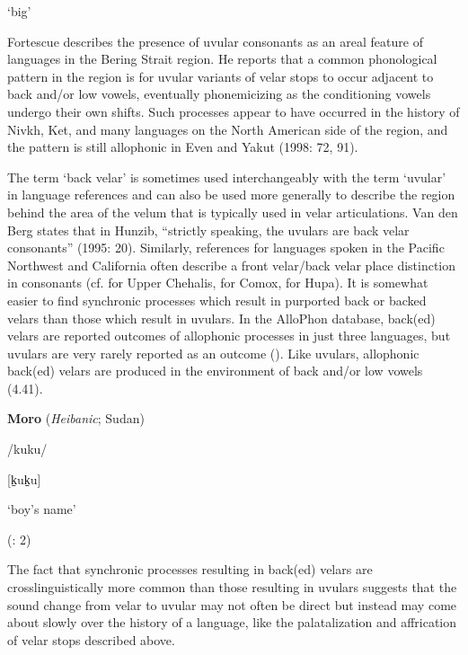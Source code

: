 ‘big’



\citep[76]{Hahn1991}

\z


  Fortescue describes the presence of uvular consonants as an areal feature of languages in the Bering Strait region. He reports that a common phonological pattern in the region is for uvular variants of velar stops to occur adjacent to back and/or low vowels, eventually phonemicizing as the conditioning vowels undergo their own shifts. Such processes appear to have occurred in the history of Nivkh, Ket, and many languages on the North American side of the region, and the pattern is still allophonic in Even and Yakut (1998: 72, 91).



  The term ‘back velar’ is sometimes used interchangeably with the term ‘uvular’ in language references and can also be used more generally to describe the region behind the area of the velum that is typically used in velar articulations. Van den Berg states that in Hunzib, “strictly speaking, the uvulars are back velar consonants” (1995: 20). Similarly, references for languages spoken in the Pacific Northwest and California often describe a front velar/back velar place distinction in consonants (cf. \citealt{Kinkade1963} for Upper Chehalis, \citealt{Harris1981} for Comox, \citealt{Golla1970} for Hupa). It is somewhat easier to find synchronic processes which result in purported back or backed velars than those which result in uvulars. In the AlloPhon database, back(ed) velars are reported outcomes of allophonic processes in just three languages, but uvulars are very rarely reported as an outcome (\citealt{BybeeEasterday2019}). Like uvulars, allophonic back(ed) velars are produced in the environment of back and/or low vowels (4.41).



\ea\label{ex:(4.41)}
  \textbf{Moro} (\textit{Heibanic}; Sudan)



/kuku/



[k̠uk̠u]



‘boy’s name’



(\citealt{BlackBlack1971}: 2)

\z


  The fact that synchronic processes resulting in back(ed) velars are crosslinguistically more common than those resulting in uvulars suggests that the sound change from velar to uvular may not often be direct but instead may come about slowly over the history of a language, like the palatalization and affrication of velar stops described above.



